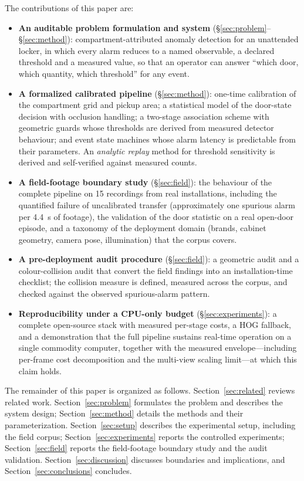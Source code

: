 \documentclass[journal,article,submit,oneauthor]{Definitions/mdpi}
\begin{document}
The contributions of this paper are:

\begin{itemize}
\item \textbf{An auditable problem formulation and system} (\S\ref{sec:problem}--\S\ref{sec:method}):
compartment-attributed anomaly detection for an unattended locker, in which every alarm
reduces to a named observable, a declared threshold and a measured value, so that an operator
can answer ``which door, which quantity, which threshold'' for any event.
\item \textbf{A formalized calibrated pipeline} (\S\ref{sec:method}): one-time calibration of
the compartment grid and pickup area; a statistical model of the door-state decision with
occlusion handling; a two-stage association scheme with geometric guards whose thresholds are
derived from measured detector behaviour; and event state machines whose alarm latency is
predictable from their parameters. An \emph{analytic replay} method for threshold sensitivity
is derived and self-verified against measured counts.
\item \textbf{A field-footage boundary study} (\S\ref{sec:field}): the behaviour of the
complete pipeline on 15 recordings from real installations, including the quantified failure
of uncalibrated transfer (approximately one spurious alarm per 4.4~s of footage), the
validation of the door statistic on a real open-door episode, and a taxonomy of the
deployment domain (brands, cabinet geometry, camera pose, illumination) that the corpus
covers.
\item \textbf{A pre-deployment audit procedure} (\S\ref{sec:field}): a geometric audit and a
colour-collision audit that convert the field findings into an installation-time checklist;
the collision measure is defined, measured across the corpus, and checked against the
observed spurious-alarm pattern.
\item \textbf{Reproducibility under a CPU-only budget} (\S\ref{sec:experiments}): a complete
open-source stack with measured per-stage costs, a HOG fallback, and a demonstration that the
full pipeline sustains real-time operation on a single commodity computer, together with the
measured envelope---including per-frame cost decomposition and the multi-view scaling
limit---at which this claim holds.
\end{itemize}

The remainder of this paper is organized as follows. Section~\ref{sec:related} reviews
related work. Section~\ref{sec:problem} formulates the problem and describes the system
design; Section~\ref{sec:method} details the methods and their parameterization.
Section~\ref{sec:setup} describes the experimental setup, including the field corpus;
Section~\ref{sec:experiments} reports the controlled experiments; Section~\ref{sec:field}
reports the field-footage boundary study and the audit validation.
Section~\ref{sec:discussion} discusses boundaries and implications, and
Section~\ref{sec:conclusions} concludes.
\end{document}
